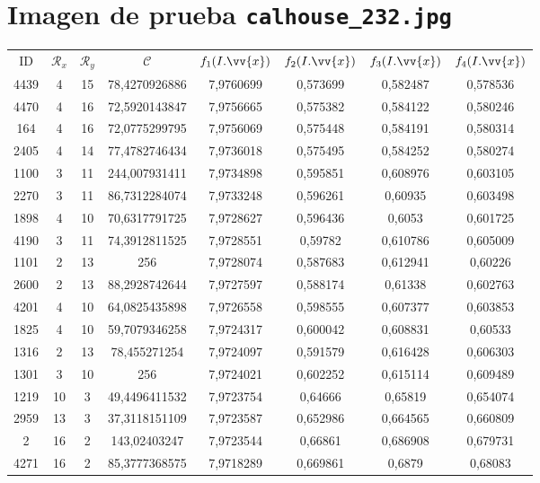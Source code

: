 \section{Imagen de prueba \texttt{calhouse\_232.jpg}}

\scriptsize
\begin{longtable}{|c|c|c|c|c|c|c|c|}
\hline
ID & $\mathscr{R}_x$ & $\mathscr{R}_y$ & $\mathscr{C}$ & $f_1(I.\vv{x})$ & $f_2(I.\vv{x})$ & $f_3(I.\vv{x})$ & $f_4(I.\vv{x})$ \\
4439 & 4 & 15 & 78,4270926886 & 7,9760699 & 0,573699 & 0,582487 & 0,578536 \\
4470 & 4 & 16 & 72,5920143847 & 7,9756665 & 0,575382 & 0,584122 & 0,580246 \\
164 & 4 & 16 & 72,0775299795 & 7,9756069 & 0,575448 & 0,584191 & 0,580314 \\
2405 & 4 & 14 & 77,4782746434 & 7,9736018 & 0,575495 & 0,584252 & 0,580274 \\
1100 & 3 & 11 & 244,007931411 & 7,9734898 & 0,595851 & 0,608976 & 0,603105 \\
2270 & 3 & 11 & 86,7312284074 & 7,9733248 & 0,596261 & 0,60935 & 0,603498 \\
1898 & 4 & 10 & 70,6317791725 & 7,9728627 & 0,596436 & 0,6053 & 0,601725 \\
4190 & 3 & 11 & 74,3912811525 & 7,9728551 & 0,59782 & 0,610786 & 0,605009 \\
1101 & 2 & 13 & 256 & 7,9728074 & 0,587683 & 0,612941 & 0,60226 \\
2600 & 2 & 13 & 88,2928742644 & 7,9727597 & 0,588174 & 0,61338 & 0,602763 \\
4201 & 4 & 10 & 64,0825435898 & 7,9726558 & 0,598555 & 0,607377 & 0,603853 \\
1825 & 4 & 10 & 59,7079346258 & 7,9724317 & 0,600042 & 0,608831 & 0,60533 \\
1316 & 2 & 13 & 78,455271254 & 7,9724097 & 0,591579 & 0,616428 & 0,606303 \\
1301 & 3 & 10 & 256 & 7,9724021 & 0,602252 & 0,615114 & 0,609489 \\
1219 & 10 & 3 & 49,4496411532 & 7,9723754 & 0,64666 & 0,65819 & 0,654074 \\
2959 & 13 & 3 & 37,3118151109 & 7,9723587 & 0,652986 & 0,664565 & 0,660809 \\
2 & 16 & 2 & 143,02403247 & 7,9723544 & 0,66861 & 0,686908 & 0,679731 \\
4271 & 16 & 2 & 85,3777368575 & 7,9718289 & 0,669861 & 0,6879 & 0,68083 \\

\end{longtable}

